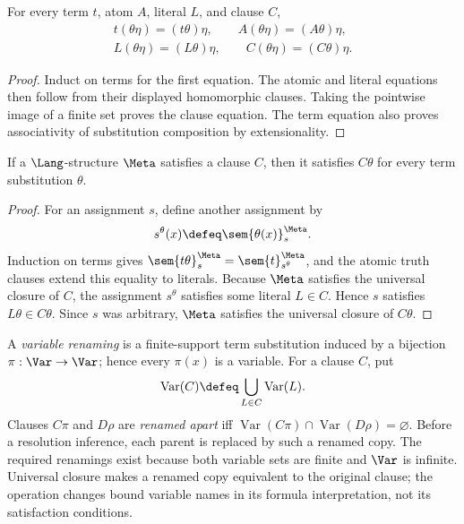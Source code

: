 \begin{lemma}
For every term \(t\), atom \(A\), literal \(L\), and clause \(C\),
\[
 \begin{gathered}
 t(\theta\eta)=(t\theta)\eta,
 \qquad A(\theta\eta)=(A\theta)\eta,\\
 L(\theta\eta)=(L\theta)\eta,
 \qquad C(\theta\eta)=(C\theta)\eta.
 \end{gathered}
\]
\end{lemma}
\begin{proof}
Induct on terms for the first equation.  The atomic and literal equations then
follow from their displayed homomorphic clauses.  Taking the pointwise image
of a finite set proves the clause equation.  The term equation also proves
associativity of substitution composition by extensionality.
\end{proof}

\begin{lemma}
\label{lem:clause-substitution}
If a \(\Lang\)-structure \(\Meta\) satisfies a clause \(C\), then it
satisfies \(C\theta\) for every term substitution \(\theta\).
\end{lemma}
\begin{proof}
For an assignment \(s\), define another assignment by
\[
 s^{\theta}(x)\defeq\sem{\theta(x)}^{\Meta}_{s}.
\]
Induction on terms gives
\(\sem{t\theta}^{\Meta}_{s}=\sem{t}^{\Meta}_{s^{\theta}}\), and the atomic
truth clauses extend this equality to literals.  Because \(\Meta\) satisfies
the universal closure of \(C\), the assignment \(s^{\theta}\) satisfies some
literal \(L\in C\).  Hence \(s\) satisfies \(L\theta\in C\theta\).  Since
\(s\) was arbitrary, \(\Meta\) satisfies the universal closure of
\(C\theta\).
\end{proof}

\begin{definition}
A \emph{variable renaming} is a finite-support term substitution induced by a
bijection \(\pi:\Var\to\Var\); hence every \(\pi(x)\) is a variable.  For a
clause \(C\), put
\[
 \operatorname{Var}(C)\defeq
 \bigcup_{L\in C}\operatorname{Var}(L).
\]
Clauses \(C\pi\) and \(D\rho\) are \emph{renamed apart} iff
\(\operatorname{Var}(C\pi)\cap\operatorname{Var}(D\rho)=\varnothing\).
Before a resolution inference, each parent is replaced by such a renamed
copy.  The required renamings exist because both variable sets are finite and
\(\Var\) is infinite.  Universal closure makes a renamed copy equivalent to
the original clause; the operation changes bound variable names in its
formula interpretation, not its satisfaction conditions.
\end{definition}

